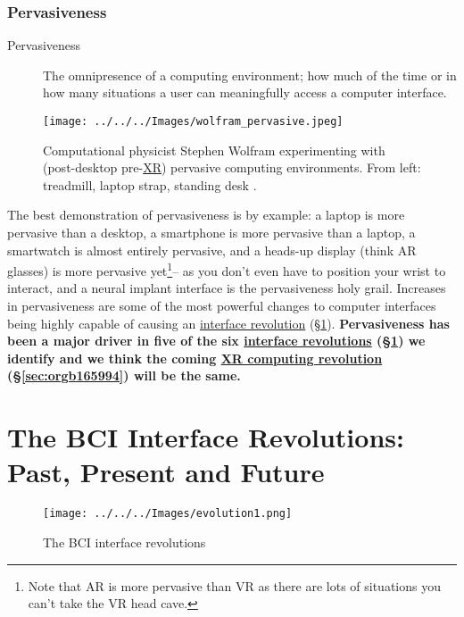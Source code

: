 \documentclass[logo,bsc,singlespacing,parskip]{infthesis}
\begin{document}
\subsection{Pervasiveness}
\label{sec:org1cf5999}
\medskip
\begin{mdframed}
\begin{description}
\item[{Pervasiveness\label{pervasiveness}}] The omnipresence of a computing environment; how much of the time or in how many situations a user can meaningfully access a computer interface.
\end{description}
\end{mdframed}

\begin{figure}[H]
\centering
\texttt{[image: ../../../Images/wolfram\_pervasive.jpeg]}
\caption[Stephen Wolfram experimenting with pervasive computing]{Computational physicist Stephen Wolfram experimenting with (post-desktop pre-\hyperref[org39cbd51]{XR}) pervasive computing environments. From left: treadmill, laptop strap, standing desk \autocite{SeekingProductiveLife}.}
\end{figure}

The best demonstration of pervasiveness is by example: a laptop is more pervasive than a desktop, a smartphone is more pervasive than a laptop, a smartwatch is almost entirely pervasive, and a heads-up display (think AR glasses) is more pervasive yet\footnote{Note that AR is more pervasive than VR as there are lots of situations you can't take the VR head cave.}-- as you don't even have to position your wrist to interact, and a neural implant interface is the pervasiveness holy grail.
Increases in pervasiveness are some of the most powerful changes to computer interfaces being highly capable of causing an \hyperref[sec:orgbbbb2de]{interface revolution} (\S \ref{sec:orgbbbb2de}).
\textbf{Pervasiveness has been a major driver in five of the six \hyperref[sec:orgbbbb2de]{interface revolutions} (\S \ref{sec:orgbbbb2de}) we identify and we think the coming \hyperref[sec:orgb165994]{XR computing revolution} (\S \ref{sec:orgb165994}) will be the same.}

\chapter{The BCI Interface Revolutions: Past, Present and Future}
\label{sec:orgbbbb2de}
\setcounter{section}{-1}
\begin{figure}[h]
\centering
\texttt{[image: ../../../Images/evolution1.png]}
\caption{The BCI interface revolutions}
\end{figure}
\end{document}
